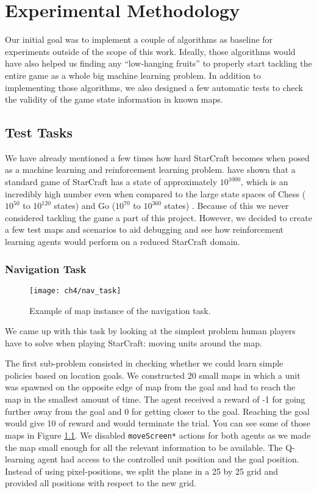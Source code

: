 \chapter{Experimental Methodology} 

Our initial goal was to implement a couple of algorithms as baseline for
experiments outside of the scope of this work. Ideally, those algorithms would
have also helped us finding any ``low-hanging fruits'' to properly start
tackling the entire game as a whole big machine learning problem. In addition to
implementing those algorithms, we also designed a few automatic tests to check
the validity of the game state information in known maps.

\section{Test Tasks}

We have already mentioned a few times how hard StarCraft becomes when posed as a
machine learning and reinforcement learning problem. \cite{ontanon2013survey}
have shown that a standard game of StarCraft has a state of approximately
$10^{1000}$, which is an incredibly high number even when compared to the large
state spaces of Chess ($10^{50}$ to $10^{120}$ states) and Go ($10^{70}$ to
$10^{360}$ states) \citep{papadimitriou2003computational}. Because of this we
never considered tackling the game a part of this project. However, we decided
to create a few test maps and scenarios to aid debugging and see how
reinforcement learning agents would perform on a reduced StarCraft domain.

\subsection{Navigation Task}

\begin{figure}[h]
    \centering
    \texttt{[image: ch4/nav\_task]}
    \caption{Example of map instance of the navigation task.}
    \label{fig:nav_task}
\end{figure}

We came up with this task by looking at the simplest problem human players have
to solve when playing StarCraft: moving units around the map.

The first sub-problem consisted in checking whether we could learn simple
policies based on location goals. We constructed 20 small maps in which a unit
was spawned on the opposite edge of map from the goal and had to reach the map
in the smallest amount of time. The agent received a reward of -1 for going
further away from the goal and 0 for getting closer to the goal. Reaching the
goal would give 10 of reward and would terminate the trial. You can see some of
those maps in Figure \ref{fig:nav_task}. We disabled \texttt{moveScreen*}
actions for both agents as we made the map small enough for all the relevant
information to be available. The Q-learning agent had access to the controlled
unit position and the goal position. Instead of using pixel-positions, we split
the plane in a 25 by 25 grid and provided all positions with respect to the
new grid. 


